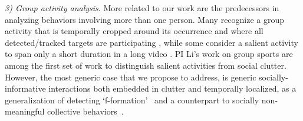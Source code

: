 \emph{3) Group activity analysis}. More related to our work are the predecessors in analyzing behaviors involving more than one person. Many recognize a group activity that is temporally cropped around its occurrence and where all detected/tracked targets are participating \cite{Intille:act,Ni:group,Lan:Group}, while some consider a salient activity to span only a short duration in a long video \cite{Hongeng:act,Gong:act,Hakeem:act,Ba:meeting,McCowan:meeting,Choi:recogtrack,Vlad:group, Ryoo:group}. PI Li's work on group sports \cite{LiIJCV2012,Li2010} are among the first set of work to distinguish salient activities from social clutter. However, the most generic case that we propose to address, is generic socially-informative interactions both embedded in clutter and temporally localized, as a generalization of detecting `f-formation'~\cite{Cristani:fformation} and a counterpart to socially non-meaningful collective behaviors~\cite{Amer:group}.


